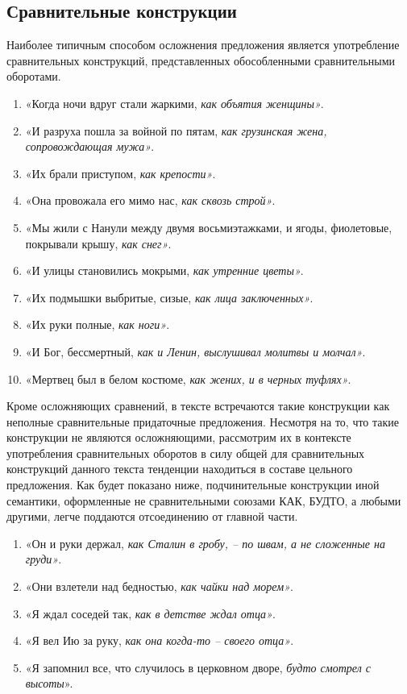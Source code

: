 \documentclass{kursa4}
\begin{document}
      \subsection{Сравнительные конструкции}
      Наиболее типичным способом осложнения предложения является употребление сравнительных конструкций, представленных обособленными сравнительными оборотами. \begin{enumerate}
        \item «Когда ночи вдруг стали жаркими, \textit{как объятия женщины»}. \item «И разруха пошла за войной по пятам, \textit{как грузинская жена, сопровождающая мужа»}. \item «Их брали приступом, \textit{как крепости»}. \item «Она провожала его мимо нас, \textit{как сквозь строй»}. \item «Мы жили с Нанули между двумя восьмиэтажками, и ягоды, фиолетовые, покрывали крышу, \textit{как снег»}. \item «И улицы становились мокрыми, \textit{как утренние цветы»}. \item «Их подмышки выбритые, сизые, \textit{как лица заключенных»}. \item «Их руки полные, \textit{как ноги»}. \item «И Бог, бессмертный, \textit{как и Ленин, выслушивал молитвы и молчал»}. \item «Мертвец был в белом костюме, \textit{как жених, и в черных туфлях»}. \end{enumerate}

      Кроме осложняющих сравнений, в тексте встречаются такие конструкции  как неполные сравнительные придаточные предложения. Несмотря на то, что такие конструкции не являются осложняющими, рассмотрим их в контексте употребления сравнительных оборотов в силу общей для сравнительных конструкций данного текста тенденции находиться в составе цельного предложения. Как будет показано ниже, подчинительные конструкции иной семантики, оформленные не сравнительными союзами КАК, БУДТО, а любыми другими, легче поддаются отсоединению от главной части. 
       \begin{enumerate}
          \item «Он и руки держал, \textit{как Сталин в гробу, – по швам, а не сложенные на груди»}. \item «Они взлетели над бедностью, \textit{как чайки над морем»}. \item «Я ждал соседей так, \textit{как в детстве ждал отца»}. \item «Я вел Ию за руку, \textit{как она когда-то – своего отца»}. \item «Я запомнил все, что случилось в церковном дворе, \textit{будто смотрел с высоты}». \end{enumerate}
\end{document}
